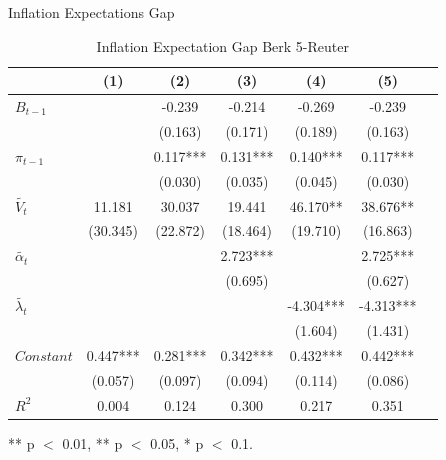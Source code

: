 \documentclass[aspectratio=169,xcolor=dvipsnames]{beamer}
\begin{document}
\begin{frame}{Inflation Expectations Gap}

\begin{table}[!ht]
\small
\centering 
  \caption{Inflation Expectation Gap Berk 5-Reuter} 
  \label{tab:Inflation Expectation Gap Berk 5-Reuter}
\begin{tabular}{l*{6}{c}}   
\toprule
                    & (1) & (2) & (3) & (4) & (5) \\
\midrule
$B_{t-1}$           &     & -0.239 & -0.214 & -0.269 & -0.239 \\
                    &     & (0.163) & (0.171) & (0.189) & (0.163) \\
$\pi_{t-1}$         &     & 0.117*** & 0.131*** & 0.140*** & 0.117*** \\
                    &     & (0.030) & (0.035) & (0.045) & (0.030) \\
$\tilde{V_t}$       & 11.181 & 30.037 & 19.441 & 46.170** & 38.676** \\
                    & (30.345) & (22.872) & (18.464) & (19.710) & (16.863) \\
$\tilde{\alpha_t}$  &     &     & 2.723*** &     & 2.725*** \\
                    &     &     & (0.695) &     & (0.627) \\
$\tilde{\lambda_t}$ &     &     &     & -4.304*** & -4.313*** \\
                    &     &     &     & (1.604) & (1.431) \\
$Constant$          & 0.447*** & 0.281*** & 0.342*** & 0.432*** & 0.442*** \\
                    & (0.057) & (0.097) & (0.094) & (0.114) & (0.086) \\
\midrule
$R^2$               & 0.004 & 0.124 & 0.300 & 0.217 & 0.351 \\
\bottomrule
\end{tabular} 
\parbox{0.8\textwidth}{\centering \small *** p $<$ 0.01, ** p $<$ 0.05, * p $<$ 0.1.}
\end{table}

\end{frame}

\end{document}
